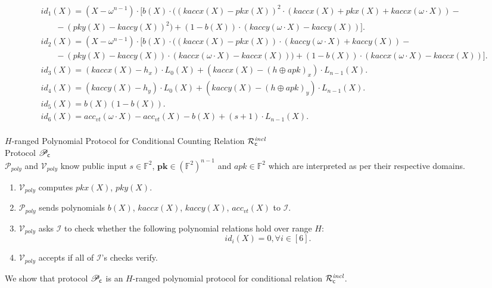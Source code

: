 \begin{align*}
& id_1(X) = (X-\omega^{n-1}) \cdot [b(X) \cdot ((kaccx(X)-pkx(X))^2 \cdot (kaccx(X)+ pkx(X) +  kaccx(\omega\cdot X)) - \\ 
& \ \ \ \ \ \ \ \ -(pky(X) - kaccy(X))^2) +  (1-b(X)) \cdot (kaccy(\omega\cdot X) - kaccy(X))]. \\
& id_2(X)  =  (X-\omega^{n-1})\cdot [b(X) \cdot ((kaccx(X) - pkx(X)) \cdot (kaccy(\omega \cdot X) + kaccy(X)) - \\
& \ \ \ \ \ \ \ \ - (pky(X) - kaccy(X)) \cdot (kaccx(\omega \cdot X) - kaccx(X))) + (1-b(X)) \cdot (kaccx(\omega \cdot X) - kaccx(X))]. \\
& id_3(X)  =  (kaccx(X) - h_x)\cdot L_0(X) + (kaccx(X) - (h\oplus apk)_{x}) \cdot L_{n-1}(X). \\ 
& id_4(X) =  (kaccy(X) - h_y)\cdot L_0(X) + (kaccy(X)  - (h\oplus apk)_{y}) \cdot L_{n-1}(X). \\
& id_5(X) =  b(X)(1-b(X)). \\
& id_6(X)  = acc_{vt}(\omega \cdot X) - acc_{vt}(X) - b(X) + (s+1) \cdot L_{n-1}(X).   \\
\end{align*}

\noindent \textsf{{$H$-ranged Polynomial Protocol for Conditional Counting Relation $\mathcal{R}^{\mathit{incl}}_{\mathsf{c}}$}} \\

\noindent \textsf{Protocol $\mathscr{P}_{\mathsf{c}}$} \\

\noindent $\mathcal{P}_{poly}$ and $\mathcal{V}_{poly}$ know public input $s \in \mathbb{F}^2$, 
$\mathbf{pk} \in (\mathbb{F}^2)^{n-1}$ and $\mathit{apk} \in \mathbb{F}^2$ which are interpreted as per their respective domains. 

\begin{enumerate}
\item $\mathcal{V}_{poly}$ computes $pkx(X)$, $pky(X)$.
\item $\mathcal{P}_{poly}$ sends polynomials $b(X)$, $kaccx(X)$, $kaccy(X)$, $acc_{vt}(X)$ to $\mathcal{I}$. 
\item $\mathcal{V}_{poly}$ asks $\mathcal{I}$ to check whether the following polynomial relations hold over range $H$:
$$id_i(X) = 0, \forall i \in [6].$$ 
\item $\mathcal{V}_{poly}$ accepts if all of $\mathcal{I}$'s checks verify. 
\end{enumerate}

\noindent We show that protocol $\mathscr{P}_{\mathsf{c}}$ is an $H$-ranged polynomial protocol for conditional relation 
$\mathcal{R}^{\mathit{incl}}_{\mathsf{c}}$. 

